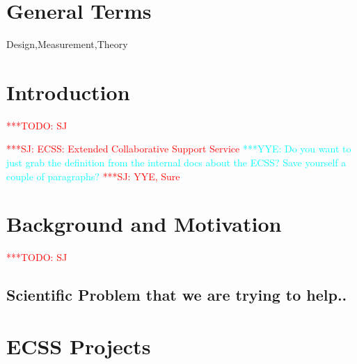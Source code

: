 \documentclass{sig-alternate}
\begin{document}
\newif\ifdraft 
\drafttrue 
\ifdraft
\newcommand{\mrnote}[1]{{\textcolor{green} { ***MR: #1 }}}
\newcommand{\jhanote}[1]{ {\textcolor{red} { ***SJ: #1 }}}
\newcommand{\yyenote}[1]{ {\textcolor{cyan} { ***YYE: #1 }}}
\newcommand{\pmnote}[1]{ {\textcolor{blue} { ***PM: #1 }}}
\newcommand{\todo}[1]{ {\textcolor{red} { ***TODO: #1 }}}
\newcommand{\fix}[1]{ {\textcolor{red} { ***FIX: #1 }}}
\newcommand{\reviewer}[1]{} 
\else \newcommand{\yyenote}[1]{}
\newcommand{\mrmnote}[1]{} \newcommand{\pmnote}[1]{}
\newcommand{\jhanote}[1]{} \newcommand{\todo}[1]{ {\textcolor{red} {
      ***TODO: #1 }}} \newcommand{\fix}[1]{} \fi




\section*{General Terms}{Design,Measurement,Theory}

 \keywords{}

\section{Introduction} \todo{SJ}

\jhanote{ECSS: Extended Collaborative Support Service } \yyenote{Do
  you want to just grab the definition from the internal docs about
  the ECSS? Save yourself a couple of paragraphs?}\jhanote{YYE, Sure}


\section{Background and Motivation} \todo{SJ}

\subsection{Scientific Problem that we are trying to help..}




\section{ECSS Projects}
\end{document}
